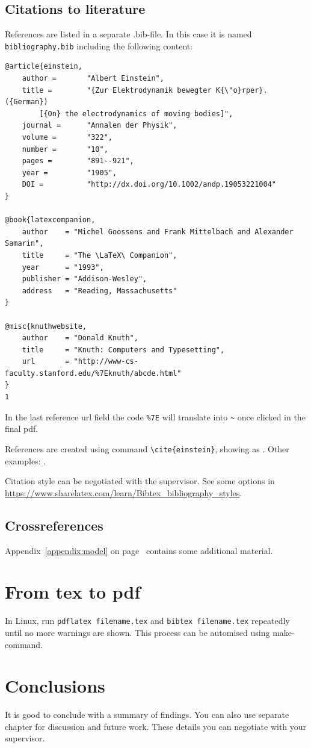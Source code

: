 \section{Citations to literature}

References are listed in a separate .bib-file. In this case it is named \texttt{bibliography.bib} including the following content:
\begin{verbatim}
@article{einstein,
    author =       "Albert Einstein",
    title =        "{Zur Elektrodynamik bewegter K{\"o}rper}. ({German})
        [{On} the electrodynamics of moving bodies]",
    journal =      "Annalen der Physik",
    volume =       "322",
    number =       "10",
    pages =        "891--921",
    year =         "1905",
    DOI =          "http://dx.doi.org/10.1002/andp.19053221004"
}
 
@book{latexcompanion,
    author    = "Michel Goossens and Frank Mittelbach and Alexander Samarin",
    title     = "The \LaTeX\ Companion",
    year      = "1993",
    publisher = "Addison-Wesley",
    address   = "Reading, Massachusetts"
}
 
@misc{knuthwebsite,
    author    = "Donald Knuth",
    title     = "Knuth: Computers and Typesetting",
    url       = "http://www-cs-faculty.stanford.edu/%7Eknuth/abcde.html"
}
1
\end{verbatim}

In the last reference url field the code \verb+%7E+ will translate into \verb+~+ once clicked in the final pdf.

References are created using command \texttt{\textbackslash cite\{einstein\}}, showing as \citep{einstein}. Other examples: \citep{latexcompanion,knuthwebsite}.

Citation style can be negotiated with the supervisor. See some options in \url{https://www.sharelatex.com/learn/Bibtex_bibliography_styles}.

\section{Crossreferences}

Appendix~\ref{appendix:model} on page~\pageref{appendix:model} contains some additional material.

\chapter{From tex to pdf}

In Linux, run \texttt{pdflatex filename.tex} and \texttt{bibtex filename.tex} repeatedly until no more warnings are shown. This process can be automised using make-command.
 
\chapter{Conclusions\label{chapter:conclusions}}

It is good to conclude with a summary of findings. You can also use separate chapter for discussion and future work. These details you can negotiate with your supervisor.